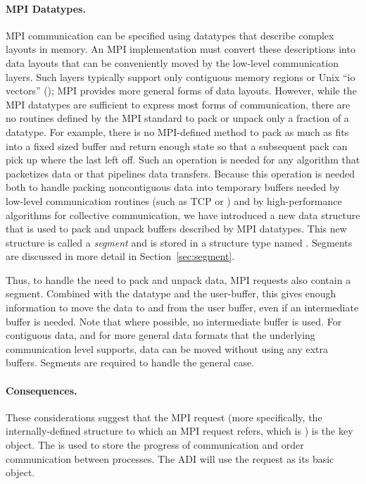 \paragraph{MPI Datatypes.}
MPI communication can be specified using datatypes that describe
complex layouts in memory.  An MPI implementation must convert these
descriptions into data layouts that can be conveniently moved by the
low-level communication layers.  Such layers typically support only
contiguous memory regions or Unix ``io vectors'' (); MPI provides more general forms of data layouts.  However,
while the MPI datatypes are sufficient to express most forms of
communication, there are no routines defined by the MPI standard to
pack or unpack only a 
fraction of a datatype.  For example, there is no MPI-defined method
to pack as much as fits into a fixed sized buffer and return enough
state so that a subsequent pack can pick up where the last left off.
Such an operation is needed for any algorithm that packetizes data or
that pipelines data transfers.  Because this operation is needed both
to handle packing noncontiguous data into temporary buffers needed by
low-level communication routines (such as TCP  or
) and by high-performance algorithms for collective
communication, we have introduced a new data structure that is used to
pack and unpack buffers described by MPI datatypes.  This new
structure is called a \emph{segment} and is stored in a
structure 
type named .  Segments are
discussed in more 
detail in Section~\ref{sec:segment}.

Thus, to handle the need to pack and unpack data, MPI requests also
contain a segment.  Combined with the datatype and the user-buffer,
this gives enough information to move the data to and from the user
buffer, even if an intermediate buffer is needed.  Note that where
possible, no intermediate buffer is used.  For contiguous data, and
for more general data formats that the underlying communication level
supports, data can be moved without using any extra buffers.  Segments
are required to handle the general case.  

\paragraph{Consequences.}
These considerations suggest that the MPI request (more
specifically, the internally-defined structure to which an MPI
request refers, which is ) is the key object.  The
 is used to store the progress of communication and
order communication between processes.  The ADI will use the request
as its basic object.

